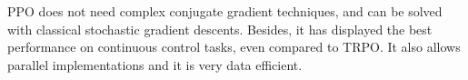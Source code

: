 PPO does not need complex conjugate gradient techniques, and can be solved with classical stochastic gradient descents. Besides, it has displayed the best performance on continuous control tasks, even compared to TRPO. It also allows parallel implementations and it is very data efficient.


